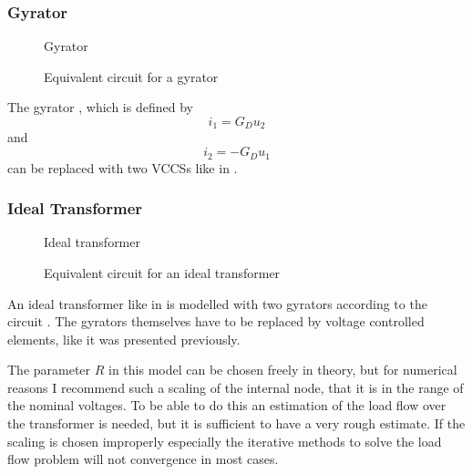 \subsubsection{Gyrator}

\begin{figure}
	\centering
	
	\caption{Gyrator}
	\label{fig:gyrator_original}
\end{figure}

\begin{figure}
	\centering
	
	\caption{Equivalent circuit for a gyrator}
	\label{fig:gyrator_equivalent}
\end{figure}

The gyrator , which is defined by
\begin{equation}
	i_1 = G_D u_2
\end{equation}
and
\begin{equation}
	i_2 = -G_D u_1
\end{equation}
can be replaced with two VCCSs like in .

\subsubsection{Ideal Transformer}

\begin{figure}
	\centering
	
	\caption{Ideal transformer}
	\label{fig:ideal_transformer_original}
\end{figure}

\begin{figure}
	\centering
	
	\caption{Equivalent circuit for an ideal transformer}
	\label{fig:ideal_transformer_equivalent}
\end{figure}

An ideal transformer like in  is modelled with two gyrators according to the circuit . The gyrators themselves have to be replaced by voltage controlled elements, like it was presented previously.

The parameter $R$ in this model can be chosen freely in theory, but for numerical reasons I recommend such a scaling of the internal node, that it is in the range of the nominal voltages. To be able to do this an estimation of the load flow over the transformer is needed, but it is sufficient to have a very rough estimate. If the scaling is chosen improperly especially the iterative methods to solve the load flow problem will not convergence in most cases.

